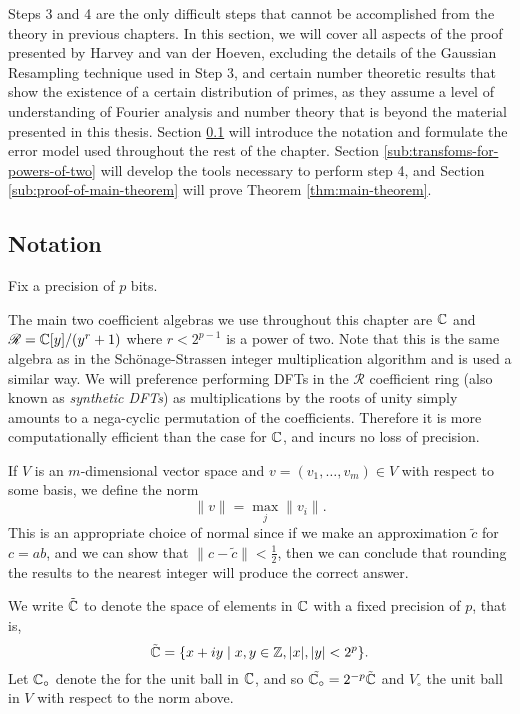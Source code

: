 Steps 3 and 4 are the only difficult steps that cannot be accomplished from the theory in previous chapters. In this section, we will cover all aspects of the proof presented by Harvey and van der Hoeven, excluding the details of the Gaussian Resampling technique used in Step 3, and certain number theoretic results that show the existence of a certain distribution of primes, as they assume a level of understanding of Fourier analysis and number theory that is beyond the material presented in this thesis. Section \ref{sub:notation} will introduce the notation and formulate the error model used throughout the rest of the chapter. Section \ref{sub:transfoms-for-powers-of-two} will develop the tools necessary to perform step 4, and Section \ref{sub:proof-of-main-theorem} will prove Theorem \ref{thm:main-theorem}.

\subsection{Notation}%
\label{sub:notation}

Fix a precision of $p$ bits.

The main two coefficient algebras we use throughout this chapter are ${\mathbb C}$ and $\mathscr{R} = {\mathbb C}[y]/(y^r + 1)$ where $r < 2^{p-1}$ is a power of two. Note that this is the same algebra as in the Sch\"{o}nage-Strassen integer multiplication algorithm and is used a similar way.
We will preference performing DFTs in the $\mathscr{R}$ coefficient ring (also known as \textit{synthetic DFTs}) as multiplications by the roots of unity simply amounts to a nega-cyclic permutation of the coefficients. Therefore it is more computationally efficient than the case for ${\mathbb C}$, and incurs no loss of precision.

If $V$ is an $m$-dimensional vector space and $v = (v_1, \ldots, v_m) \in V$ with respect to some basis, we define the norm
\[
    \|v\| = \max_j \|v_i\|.
\]
This is an appropriate choice of normal since if we make an approximation $\tilde{c}$ for $c = ab$, and we can show that $\|c - \tilde{c}\| < \frac{1}{2}$, then we can conclude that rounding the results to the nearest integer will produce the correct answer.

We write $\tilde{{\mathbb C}}$ to denote the space of elements in ${\mathbb C}$ with a fixed precision of $p$, that is, 
\[
    \tilde{{\mathbb C}} = \{x + iy \;\vert \; x, y \in {\mathbb Z}, |x|, |y| < 2^p \}.
\]
Let ${\mathbb C}_\circ$ denote the for the unit ball in ${\mathbb C}$, and so $\tilde{{\mathbb C}_{\circ}} = 2^{-p} \tilde{{\mathbb C}}$ and $V_\circ$ the unit ball in $V$ with respect to the norm above.

